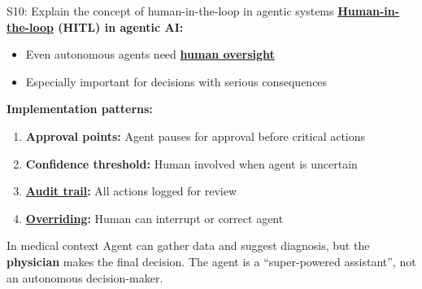 \documentclass[aspectratio=169, 10pt]{beamer}
\begin{document}
\begin{frame}{S10: Explain the concept of human-in-the-loop in agentic systems}
    \textbf{\href{https://en.wikipedia.org/wiki/Human-in-the-loop}{Human-in-the-loop} (HITL) in agentic AI:}
    
    \vspace{0.3cm}
    \begin{itemize}
        \item Even autonomous agents need \textbf{\href{https://en.wikipedia.org/wiki/Human_oversight_of_AI}{human oversight}}
        \item Especially important for decisions with serious consequences
    \end{itemize}
    
    \vspace{0.3cm}
    \textbf{Implementation patterns:}
    \begin{enumerate}
        \item \textbf{Approval points:} Agent pauses for approval before critical actions
        \item \textbf{Confidence threshold:} Human involved when agent is uncertain
        \item \textbf{\href{https://en.wikipedia.org/wiki/Audit_trail}{Audit trail}:} All actions logged for review
        \item \textbf{\href{https://en.wikipedia.org/wiki/Override}{Overriding}:} Human can interrupt or correct agent
    \end{enumerate}
    
    \vspace{0.3cm}
    \begin{alertblock}{In medical context}
        Agent can gather data and suggest diagnosis, but the \textbf{physician} makes the final decision. The agent is a ``super-powered assistant'', not an autonomous decision-maker.
    \end{alertblock}
\end{frame}
\end{document}
